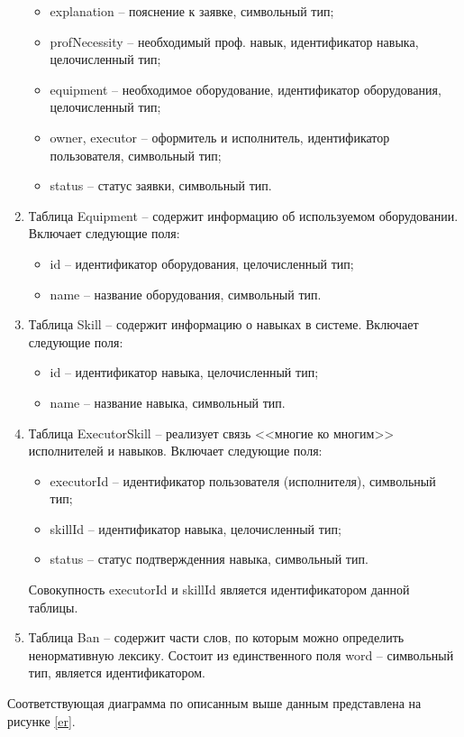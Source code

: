 \begin{enumerate}
\begin{itemize}
		\item explanation -- пояснение к заявке, символьный тип;
		\item profNecessity -- необходимый проф. навык, идентификатор навыка, целочисленный тип;
		\item equipment -- необходимое оборудование, идентификатор оборудования, целочисленный тип; 
		\item owner, executor -- оформитель и исполнитель, идентификатор пользователя, символьный тип;
		\item status -- статус заявки, символьный тип.
	\end{itemize}
	\item Таблица Equipment -- содержит информацию об используемом оборудовании. Включает следующие поля:
	\begin{itemize}
		\item id -- идентификатор оборудования, целочисленный тип;
		\item name -- название оборудования, символьный тип.
	\end{itemize}
	\item Таблица Skill -- содержит информацию о навыках в системе. Включает следующие поля:
	\begin{itemize}
		\item id -- идентификатор навыка, целочисленный тип;
		\item name -- название навыка, символьный тип.
	\end{itemize}
	\item Таблица ExecutorSkill -- реализует связь <<многие ко многим>> исполнителей и навыков. Включает следующие поля:
	\begin{itemize}
		\item executorId -- идентификатор пользователя (исполнителя), символьный тип;
		\item skillId -- идентификатор навыка, целочисленный тип;
		\item status -- статус подтвержденния навыка, символьный тип.
	\end{itemize}
	Совокупность executorId и skillId является идентификатором данной таблицы.
	\item Таблица Ban -- содержит части слов, по которым можно определить ненормативную лексику. Состоит из единственного поля word -- символьный тип, является идентификатором.
\end{enumerate}
\newpage
Соответствующая диаграмма по описанным выше данным представлена на рисунке \ref{er}.

